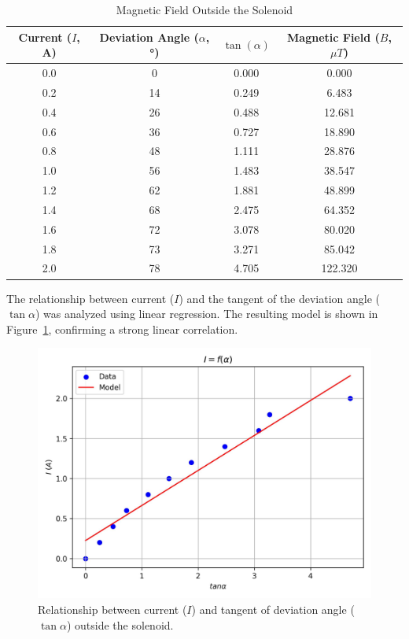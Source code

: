 \documentclass[journal]{IEEEtran}
\begin{document}
    \begin{table}[H]
        \centering
        \caption{Magnetic Field Outside the Solenoid}
        \label{tab:outside_field}
        \begin{tabular}{cccc}
        \hline
        Current ($I$, A) & Deviation Angle ($\alpha$, °) & $\tan(\alpha)$ & Magnetic Field ($B$, $\mu T$) \\ \hline
        0.0 & 0  & 0.000 & 0.000 \\
        0.2 & 14 & 0.249 & 6.483 \\
        0.4 & 26 & 0.488 & 12.681 \\
        0.6 & 36 & 0.727 & 18.890 \\
        0.8 & 48 & 1.111 & 28.876 \\
        1.0 & 56 & 1.483 & 38.547 \\
        1.2 & 62 & 1.881 & 48.899 \\
        1.4 & 68 & 2.475 & 64.352 \\
        1.6 & 72 & 3.078 & 80.020 \\
        1.8 & 73 & 3.271 & 85.042 \\
        2.0 & 78 & 4.705 & 122.320 \\ \hline
        \end{tabular}
        \end{table}
        
        
        
    
    The relationship between current (\( I \)) and the tangent of the deviation angle (\( \tan \alpha \)) was analyzed using linear regression. The resulting model is shown in Figure~\ref{fig:current_vs_tan_alpha}, confirming a strong linear correlation.
    
    \begin{figure}[H]
    \centering
    \includegraphics[width=\linewidth]{output_plots/current_vs_tan_alpha.jpg}
    \caption{Relationship between current (\( I \)) and tangent of deviation angle (\( \tan \alpha \)) outside the solenoid.}
    \label{fig:current_vs_tan_alpha}
    \end{figure}
    
\end{document}
